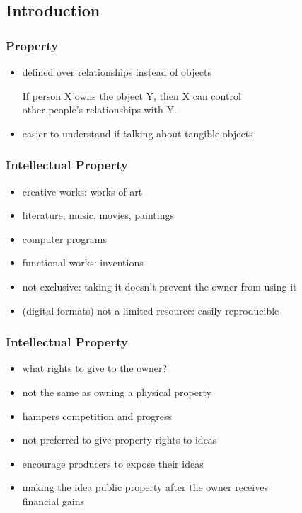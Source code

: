 \documentclass[dvipsnames]{beamer}
\theoremstyle{plain}
\begin{document}
\subsection{Introduction}

\begin{frame}
  \frametitle{Property}

  \begin{itemize}
    \item defined over relationships instead of objects

    \medskip
    If person X owns the object Y, then X can control\\
    other people's relationships with Y.

    \medskip
    \item easier to understand if talking about tangible objects
  \end{itemize}
\end{frame}

\begin{frame}
  \frametitle{Intellectual Property}

  \begin{itemize}
    \item creative works: works of art
    \item literature, music, movies, paintings
    \item computer programs

    \medskip
    \item functional works: inventions
  \end{itemize}

  \pause
  \bigskip
  \begin{itemize}
    \item not exclusive: taking it doesn't prevent the owner from using it

    \medskip
    \item (digital formats) not a limited resource: easily reproducible
  \end{itemize}
\end{frame}

\begin{frame}
  \frametitle{Intellectual Property}

  \begin{itemize}
    \item what rights to give to the owner?
    \smallskip
    \item not the same as owning a physical property
    \item hampers competition and progress

    \pause
    \bigskip
    \item not preferred to give property rights to ideas
    \smallskip
    \item encourage producers to expose their ideas
    \item making the idea public property after the owner receives\\
      financial gains
  \end{itemize}
\end{frame}
\end{document}
